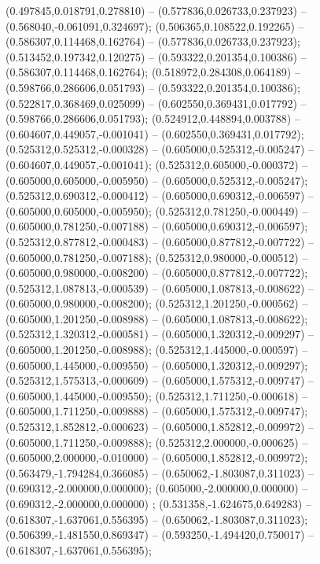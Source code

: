  (0.497845,0.018791,0.278810) -- (0.577836,0.026733,0.237923) -- (0.568040,-0.061091,0.324697);
 (0.506365,0.108522,0.192265) -- (0.586307,0.114468,0.162764) -- (0.577836,0.026733,0.237923);
 (0.513452,0.197342,0.120275) -- (0.593322,0.201354,0.100386) -- (0.586307,0.114468,0.162764);
 (0.518972,0.284308,0.064189) -- (0.598766,0.286606,0.051793) -- (0.593322,0.201354,0.100386);
 (0.522817,0.368469,0.025099) -- (0.602550,0.369431,0.017792) -- (0.598766,0.286606,0.051793);
 (0.524912,0.448894,0.003788) -- (0.604607,0.449057,-0.001041) -- (0.602550,0.369431,0.017792);
 (0.525312,0.525312,-0.000328) -- (0.605000,0.525312,-0.005247) -- (0.604607,0.449057,-0.001041);
 (0.525312,0.605000,-0.000372) -- (0.605000,0.605000,-0.005950) -- (0.605000,0.525312,-0.005247);
 (0.525312,0.690312,-0.000412) -- (0.605000,0.690312,-0.006597) -- (0.605000,0.605000,-0.005950);
 (0.525312,0.781250,-0.000449) -- (0.605000,0.781250,-0.007188) -- (0.605000,0.690312,-0.006597);
 (0.525312,0.877812,-0.000483) -- (0.605000,0.877812,-0.007722) -- (0.605000,0.781250,-0.007188);
 (0.525312,0.980000,-0.000512) -- (0.605000,0.980000,-0.008200) -- (0.605000,0.877812,-0.007722);
 (0.525312,1.087813,-0.000539) -- (0.605000,1.087813,-0.008622) -- (0.605000,0.980000,-0.008200);
 (0.525312,1.201250,-0.000562) -- (0.605000,1.201250,-0.008988) -- (0.605000,1.087813,-0.008622);
 (0.525312,1.320312,-0.000581) -- (0.605000,1.320312,-0.009297) -- (0.605000,1.201250,-0.008988);
 (0.525312,1.445000,-0.000597) -- (0.605000,1.445000,-0.009550) -- (0.605000,1.320312,-0.009297);
 (0.525312,1.575313,-0.000609) -- (0.605000,1.575312,-0.009747) -- (0.605000,1.445000,-0.009550);
 (0.525312,1.711250,-0.000618) -- (0.605000,1.711250,-0.009888) -- (0.605000,1.575312,-0.009747);
 (0.525312,1.852812,-0.000623) -- (0.605000,1.852812,-0.009972) -- (0.605000,1.711250,-0.009888);
 (0.525312,2.000000,-0.000625) -- (0.605000,2.000000,-0.010000) -- (0.605000,1.852812,-0.009972);
 (0.563479,-1.794284,0.366085) -- (0.650062,-1.803087,0.311023) -- (0.690312,-2.000000,0.000000);
 (0.605000,-2.000000,0.000000) -- (0.690312,-2.000000,0.000000) ;
 (0.531358,-1.624675,0.649283) -- (0.618307,-1.637061,0.556395) -- (0.650062,-1.803087,0.311023);
 (0.506399,-1.481550,0.869347) -- (0.593250,-1.494420,0.750017) -- (0.618307,-1.637061,0.556395);
